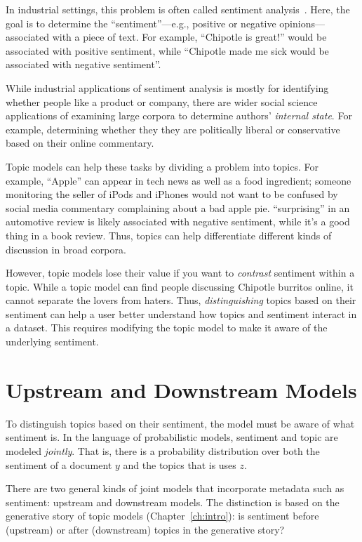 In industrial settings, this problem is often called sentiment
analysis~\citep{pang-08}.  Here, the goal is to determine the
``sentiment''---e.g., positive or negative opinions---associated with
a piece of text.  For example, ``Chipotle is great!'' would be
associated with positive sentiment, while ``Chipotle made me sick
would be associated with negative sentiment''.

While industrial applications of sentiment analysis is mostly for
identifying whether people like a product or company, there are wider
social science applications of examining large corpora to determine
authors' \emph{internal state}.  For example, determining whether they
they are politically liberal or conservative based on their online
commentary.

Topic models can help these tasks by dividing a problem into topics.
For example, ``Apple'' can appear in tech news as well as a food
ingredient; someone monitoring the seller of iPods and iPhones would
not want to be confused by social media commentary complaining about a
bad apple pie.  ``surprising'' in an automotive review is likely
associated with negative sentiment, while it's a good thing in a book
review.  Thus, topics can help differentiate different kinds of
discussion in broad corpora.

However, topic models lose their value if you want to \emph{contrast}
sentiment within a topic.  While a topic model can find people
discussing Chipotle burritos online, it cannot separate the lovers from
haters.  Thus, \emph{distinguishing} topics based on their sentiment
can help a user better understand how topics and sentiment interact in
a dataset.  This requires modifying the topic model to make it aware
of the underlying sentiment.


\section{Upstream and Downstream Models}

To distinguish topics based on their sentiment, the model must be
aware of what sentiment is.  In the language of probabilistic models,
sentiment and topic are modeled \emph{jointly}.  That is, there is a
probability distribution over both the sentiment of a document $y$ and
the topics that is uses $z$.

There are two general kinds of joint models that incorporate metadata
such as sentiment: upstream and downstream models.  The distinction is
based on the generative story of topic models (Chapter~\ref{ch:intro}): is
sentiment before (upstream) or after (downstream) topics in the
generative story?

